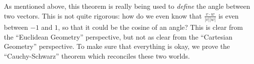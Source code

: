 \documentclass{ximera}
\begin{document}
 
As mentioned above, this theorem is really being used to
\textit{define} the angle between two vectors.  This is not quite
rigorous: how do we even know that $\frac{v \cdot w}{|v||w|}$ is even
between $-1$ and $1$, so that it could be the cosine of an angle?
This is clear from the ``Euclidean Geometry'' perspective, but not as
clear from the ``Cartesian Geometry'' perspective.  To make sure that
everything is okay, we prove the ``Cauchy-Schwarz'' theorem which
reconciles these two worlds.
 
\end{document}
